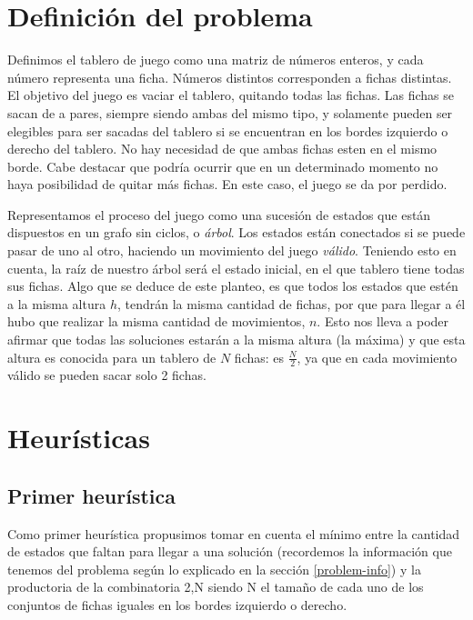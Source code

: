 \documentclass[a4paper,10pt]{article}
\begin{document}
\setcounter{page}{1}


\section{Definición del problema}

Definimos el tablero de juego como una matriz de números enteros, y cada número representa una ficha. Números distintos corresponden a fichas distintas. 
El objetivo del juego es vaciar el tablero, quitando todas las fichas. Las fichas se sacan de a pares, siempre siendo ambas del mismo tipo, y solamente pueden ser elegibles 
para ser sacadas del tablero si se encuentran en los bordes izquierdo o derecho del tablero. No hay necesidad de que ambas fichas esten en el mismo borde. Cabe destacar 
que podría ocurrir que en un determinado momento no haya posibilidad de quitar más fichas. En este caso, el juego se da por perdido.

\label{problem-info}
Representamos el proceso del juego como una sucesión de estados que están dispuestos en un grafo sin ciclos, o \textit{árbol}. Los estados están conectados si se puede pasar de uno 
al otro, haciendo un movimiento del juego \textit{válido}. Teniendo esto en cuenta, la raíz de nuestro árbol será el estado inicial, en el que tablero tiene todas sus fichas. Algo que 
se deduce de este planteo, es que todos los estados que estén a la misma altura $h$, tendrán la misma cantidad de fichas, por que para llegar a él hubo que realizar la misma cantidad 
de movimientos, $n$. Esto nos lleva a poder afirmar que todas las soluciones estarán a la misma altura (la máxima) y que esta altura es conocida para un tablero de $N$ fichas: es 
$\frac{N}{2}$, ya que en cada movimiento válido se pueden sacar solo 2 fichas.

\section{Heurísticas}

    \subsection{Primer heurística}
    
    Como primer heurística propusimos tomar en cuenta el mínimo entre la cantidad de estados que faltan para llegar a una solución (recordemos la información que tenemos del 
    problema según lo explicado en la sección \ref{problem-info}) y la productoria de la combinatoria 2,N 
    siendo N el tamaño de cada uno de los conjuntos de fichas iguales en los bordes izquierdo o derecho.\\
\end{document}
